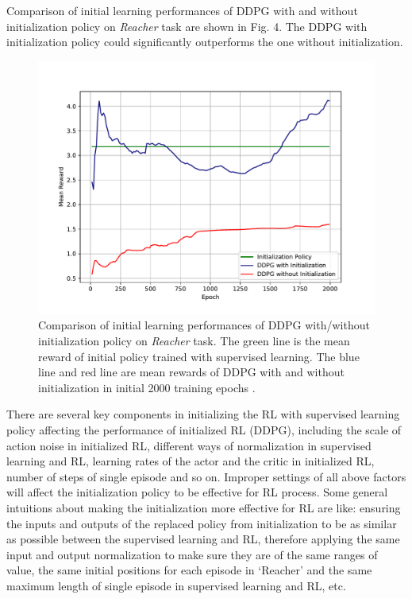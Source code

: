 \documentclass{article}
\begin{document}
Comparison of initial learning performances of DDPG with and without initialization policy on \textit{Reacher} task are shown in Fig. 4. The DDPG with initialization policy could significantly outperforms the one without initialization. 

\begin{figure}[htbp]
	\centering
	\includegraphics[scale=0.5]{img/ddpg_compare1.pdf}
	\caption{Comparison of initial learning performances of DDPG with/without initialization policy on \textit{Reacher} task. The green line is the mean reward of initial policy trained with supervised learning. The blue line and red line are mean rewards of DDPG with and without initialization in initial 2000 training epochs . }
	\label{fig:universe}
\end{figure}

There are several key components in initializing the RL with supervised learning policy affecting the performance of initialized RL (DDPG), including the scale of action noise in initialized RL, different ways of normalization in supervised learning and RL, learning rates of the actor and the critic in initialized RL, number of steps of single episode and so on. Improper settings of all above factors will affect the initialization policy to be effective for RL process. Some general intuitions about making the initialization more effective for RL are like: ensuring the inputs and outputs of the replaced policy from initialization to be as similar as possible between the supervised learning and RL, therefore applying the same input and output normalization to make sure they are of the same ranges of value, the same initial positions for each episode in `Reacher' and the same maximum length of single episode in supervised learning and RL, etc. 
\end{document}

